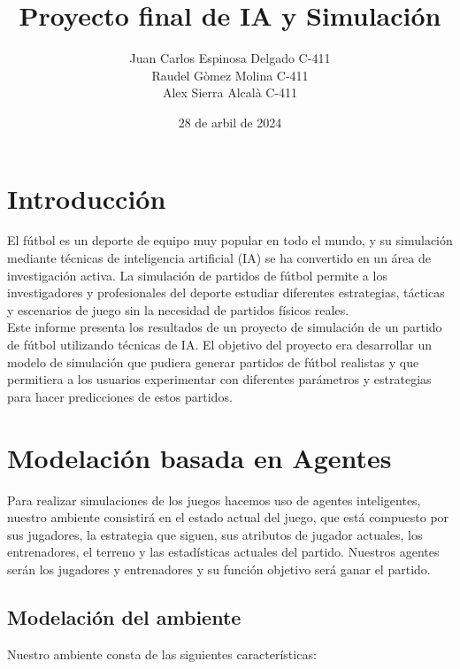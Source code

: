 \documentclass{article}
\title{Proyecto final de IA y Simulación}
\author{Juan Carlos Espinosa Delgado C-411 \\
        Raudel Gòmez Molina C-411\\
        Alex Sierra Alcalà C-411
}
\date{28 de arbil de 2024}
\begin{document}
\maketitle
\newpage

\tableofcontents
\newpage

\section{Introducción}
El fútbol es un deporte de equipo muy popular en todo el mundo, y su simulación mediante técnicas de inteligencia artificial (IA) se ha convertido en un área de investigación activa. La simulación de partidos de fútbol permite a los investigadores y profesionales del deporte estudiar diferentes estrategias, tácticas y escenarios de juego sin la necesidad de partidos físicos reales.\\
Este informe presenta los resultados de un proyecto de simulación de un partido de fútbol utilizando técnicas de IA. El objetivo del proyecto era desarrollar un modelo de simulación que pudiera generar partidos de fútbol realistas y que permitiera a los usuarios experimentar con diferentes parámetros y estrategias para hacer predicciones de estos partidos.
\newpage
\section{Modelación basada en Agentes}
Para realizar simulaciones de los juegos hacemos uso de agentes inteligentes, nuestro
ambiente consistirá en el estado actual del juego, que está compuesto por sus jugadores, la
estrategia que siguen, sus atributos de jugador actuales, los entrenadores, el terreno y las estadísticas actuales del partido.
Nuestros agentes serán los jugadores y entrenadores y su función objetivo será ganar el partido.

\subsection{Modelación del ambiente}
Nuestro ambiente consta de las siguientes características:
\end{document}

